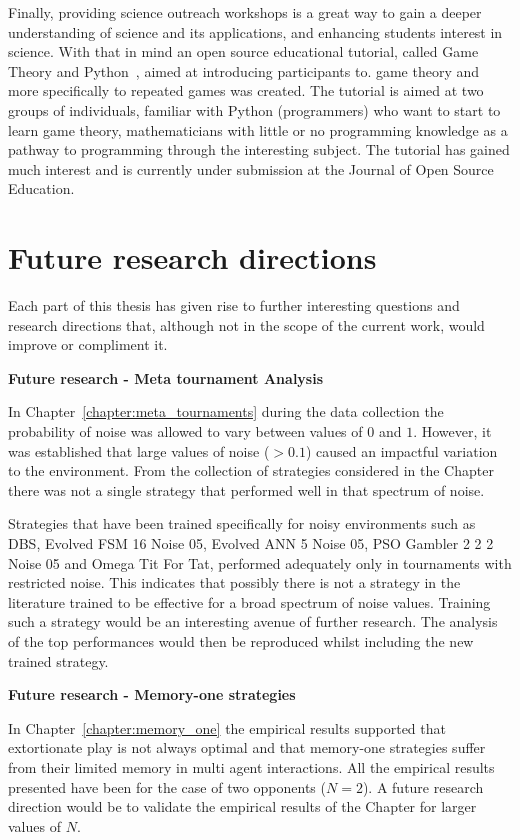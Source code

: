 Finally, providing science outreach workshops is a great way to gain a deeper
understanding of science and its applications, and enhancing students interest
in science. With that in mind an open source educational tutorial, called Game
Theory and Python~\cite{Glynatsi2017_game}, aimed at introducing participants to. %
game theory and more specifically to repeated games was created. The tutorial is
aimed at two groups of individuals, familiar with Python (programmers) who want
to start to learn game theory, mathematicians with little or no programming
knowledge as a pathway to programming through the interesting subject. The
tutorial has gained much interest and is currently under submission at the
Journal of Open Source Education.

\section{Future research directions}

Each part of this thesis has given rise to further interesting questions and
research directions that, although not in the scope of the current work, would
improve or compliment it.

\textbf{Future research - Meta tournament Analysis}

In Chapter~\ref{chapter:meta_tournaments} during the data collection the
probability of noise was allowed to vary between values of \(0\) and \(1\).
However, it was established that large values of noise (\(>
0.1\)) caused an impactful variation to the environment. From the collection of
\numberofstrategies strategies considered in the Chapter there was not a single
strategy that performed well in that spectrum of noise.

Strategies that have been trained specifically for noisy environments such
as DBS, Evolved FSM 16 Noise 05, Evolved ANN 5 Noise 05, PSO Gambler 2 2 2 Noise 05
and Omega Tit For Tat, performed adequately only in tournaments with restricted
noise. This indicates that possibly there is not a strategy in the literature
trained to be effective for a broad spectrum of noise values. Training such
a strategy would be an interesting avenue of further research. The analysis of the
top performances would then be reproduced whilst including the new trained strategy.

\textbf{Future research - Memory-one strategies}

In Chapter~\ref{chapter:memory_one} the empirical results supported that
extortionate play is not always optimal and that memory-one strategies suffer
from their limited memory in multi agent interactions. All the empirical results
presented have been for the case of two opponents (\(N=2\)). A
future research direction would be to validate the empirical results of the Chapter for
larger values of \(N\).

